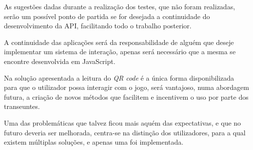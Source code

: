 As sugestões dadas durante a realização dos testes, que não foram realizadas, serão um possível ponto de partida se for desejada a continuidade do desenvolvimento da API, facilitando todo o trabalho posterior. 

A continuidade das aplicações será da responsabilidade de alguém que deseje implementar um sistema de interação, apenas será necessário que a mesma se encontre desenvolvida em JavaScript.

Na solução apresentada a leitura do \textit{QR code} é a única forma disponibilizada para que o utilizador possa interagir com o jogo, será vantajoso, numa abordagem futura, a criação de novos métodos que facilitem e incentivem o uso por parte dos transeuntes.

Uma das problemáticas que talvez ficou mais aquém das expectativas, e que no futuro deveria ser melhorada, centra-se na distinção dos utilizadores, para a qual existem múltiplas soluções, e apenas uma foi implementada.

